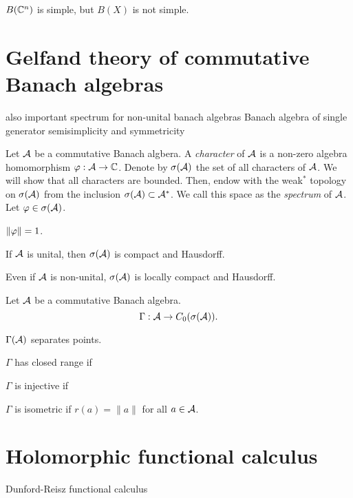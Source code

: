 \documentclass{../note}
\begin{document}
$B(\mathbb{C}^n)$ is simple, but $B(X)$ is not simple.




\section{Gelfand theory of commutative Banach algebras}

also important spectrum for non-unital banach algebras
Banach algebra of single generator
semisimplicity and symmetricity

\begin{prb}
Let $\mathcal{A}$ be a commutative Banach algbera.
A \emph{character} of $\mathcal{A}$ is a non-zero algebra homomorphism $\varphi:\mathcal{A}\to\mathbb{C}$.
Denote by $\sigma(\mathcal{A})$ the set of all characters of $\mathcal{A}$.
We will show that all characters are bounded.
Then, endow with the weak$^*$ topology on $\sigma(\mathcal{A})$ from the inclusion $\sigma(\mathcal{A})\subset\mathcal{A}^*$.
We call this space as the \emph{spectrum} of $\mathcal{A}$.
Let $\varphi\in\sigma(\mathcal{A})$.
\begin{parts}
\item $\|\varphi\|=1$.
\item If $\mathcal{A}$ is unital, then $\sigma(\mathcal{A})$ is compact and Hausdorff.
\item Even if $\mathcal{A}$ is non-unital, $\sigma(\mathcal{A})$ is locally compact and Hausdorff.
\end{parts}
\end{prb}


\begin{prb}
Let $\mathcal{A}$ be a commutative Banach algebra.
\[\Gamma:\mathcal{A}\to C_0(\sigma(\mathcal{A})).\]
\begin{parts}
\item $\Gamma(\mathcal{A})$ separates points.
\item $\Gamma$ has closed range if
\item $\Gamma$ is injective if
\item $\Gamma$ is isometric if $r(a)=\|a\|$ for all $a\in\mathcal{A}$.
\end{parts}
\end{prb}

\section{Holomorphic functional calculus}

Dunford-Reisz functional calculus
\end{document}
